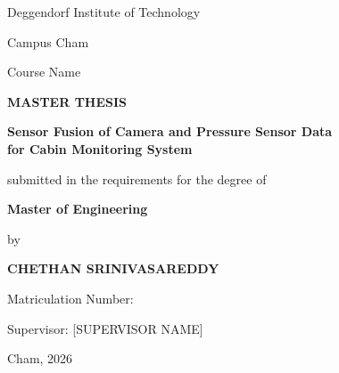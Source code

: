 \documentclass[11pt,a4paper]{report}
\begin{document}
\setcounter{page}{1}

\begin{titlepage}
\centering

{\large Deggendorf Institute of Technology\par}
{\large Campus Cham\par}
\vspace{0.3cm}
{\large Course Name\par}

\vspace{1.5cm}


\vspace{2cm}

{\Large \textbf{MASTER THESIS}\par}

\vspace{1.5cm}

{\Large \textbf{Sensor Fusion of Camera and Pressure Sensor Data\\ for Cabin Monitoring System}\par}

\vspace{1.5cm}

{\large submitted in the requirements for the degree of\par}
\vspace{0.2cm}
{\large \textbf{Master of Engineering}\par}

\vspace{2cm}

{\large by\par}
\vspace{0.2cm}
{\large \textbf{CHETHAN SRINIVASAREDDY}\par}
\vspace{0.2cm}
{\large Matriculation Number: \par}

\vspace{1.5cm}

{\large Supervisor: [SUPERVISOR NAME]\par}

\vspace{1.5cm}

{\large Cham, 2026\par}

\end{titlepage}
\end{document}
